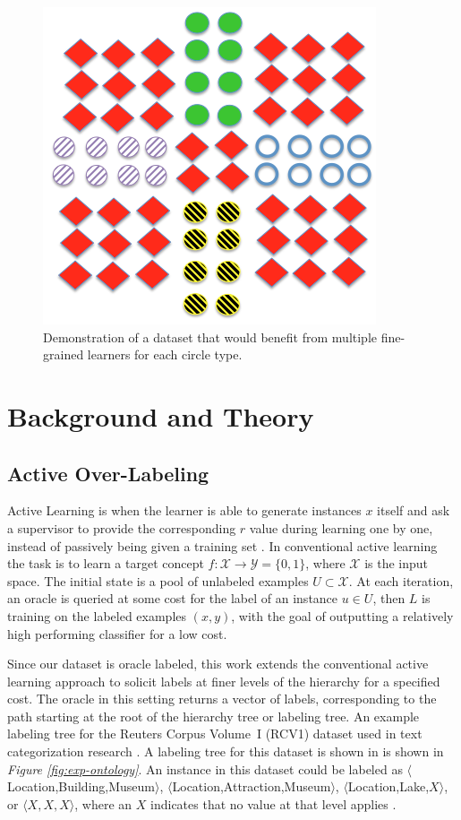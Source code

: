 \documentclass[ms]{nuthesis}
\begin{document}
\FloatBarrier
\begin{figure}[!htb]
	\centering
    \includegraphics[width=0.5\columnwidth]{fig/union}
    \caption{Demonstration of a dataset that would benefit from multiple fine-grained
    learners for each circle type.}
    \label{fig:union}
\end{figure}
\FloatBarrier


\chapter{Background and Theory}
\section{Active Over-Labeling}
\label{sect:activeOverLabel}
\par Active Learning is when the learner is able to generate instances $x$ itself
and ask a supervisor to provide the corresponding $r$ value during learning one by
one, instead of passively being given a training set \cite{mitchell}. In conventional
active learning the task is to learn a target concept
$f : {\mathcal X} \rightarrow {\mathcal Y}=\{0, 1\} $, where $\mathcal X$
is the input space. The initial state is a pool of unlabeled examples
$U \subset {\mathcal X}$. At each iteration, an oracle is queried at some
cost for the label of an instance $u \in U$, then $L$ is training on the labeled examples
$(x,y)$, with the goal of outputting a relatively high performing classifier for a low cost.
\par Since our dataset is oracle labeled, this work extends the conventional active
learning approach to solicit labels at finer levels of the hierarchy for a specified cost.
 The oracle in this setting returns a vector of labels, corresponding to the path starting
 at the root of the hierarchy tree or labeling tree. An example labeling tree for the
 Reuters Corpus Volume~I (RCV1) dataset used in text categorization research \cite{Lewis2004}.
 A labeling tree for this dataset is shown in is shown in
 \textit{Figure \ref{fig:exp-ontology}}. An instance in this dataset could be labeled as
 $\langle$Location,Building,Museum$\rangle$,  $\langle$Location,Attraction,Museum$\rangle$,
$\langle$Location,Lake,$X\rangle$, or $\langle X,X,X \rangle$, where an $X$ indicates
that no value at that level applies \cite{yugi}.
\end{document}
